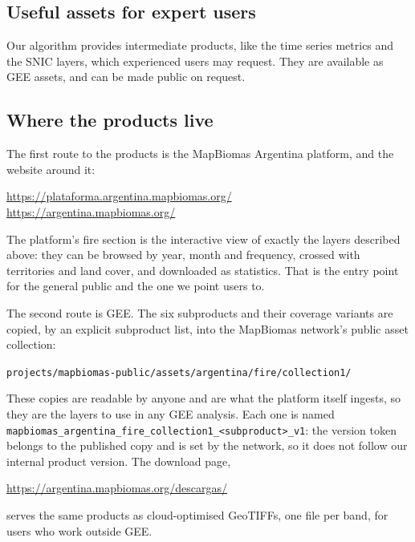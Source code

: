 \documentclass[11pt,a4paper]{article}
\begin{document}
\subsection{Useful assets for expert users}

Our algorithm provides intermediate products, like the time series metrics and the 
SNIC layers, which experienced users may request. They are available as
GEE assets, and can be made public on request.

\subsection{Where the products live}

The first route to the products is the MapBiomas Argentina platform, and the website around it:

\begin{center}
\small\url{https://plataforma.argentina.mapbiomas.org/}\\[0.2cm]
\small\url{https://argentina.mapbiomas.org/}
\end{center}

\noindent The platform's fire section is the interactive view of exactly the layers described
above: they can be browsed by year, month and frequency, crossed with territories and land cover,
and downloaded as statistics. That is the entry point for the general public and the one we point
users to.

The second route is GEE. The six subproducts and their coverage variants are copied, by an
explicit subproduct list, into the MapBiomas network's public asset collection:

\begin{center}
\small\texttt{projects/mapbiomas-public/assets/argentina/fire/collection1/}
\end{center}

\noindent These copies are readable by anyone and are what the platform itself ingests, so they are
the layers to use in any GEE analysis. Each one is named
\texttt{mapbiomas\_argentina\_fire\_collection1\_<subproduct>\_v1}: the version token belongs to the
published copy and is set by the network, so it does not follow our internal product version. The download page,

\begin{center}
\small\url{https://argentina.mapbiomas.org/descargas/}
\end{center}

\noindent serves the same products as cloud-optimised GeoTIFFs, one file per band, for users who
work outside GEE.
\end{document}
